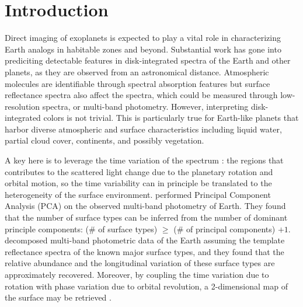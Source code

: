\documentclass[iop,numberedappendix,apj]{emulateapj}
\begin{document}
  



\section{Introduction}
\label{sec:intro}

Direct imaging of exoplanets is expected to play a vital role in characterizing Earth analogs in habitable zones and beyond. 
Substantial work has gone into prediciting detectable features in disk-integrated spectra of the Earth and other planets, as they are observed from an astronomical distance. 
Atmospheric molecules are identifiable through spectral absorption features \citep[e.g.,][]{DesMarais2002} but surface reflectance spectra also affect the spectra, which could be measured through low-resolution spectra, or multi-band photometry. 
However, interpreting disk-integrated colors is not trivial. 
This is particularly true for Earth-like planets that harbor diverse atmospheric and surface characteristics including liquid water, partial cloud cover, continents, and possibly vegetation. 

A key here is to leverage the time variation of the spectrum \citep{Ford2001}: the regions that contributes to the scattered light change due to the planetary rotation and  orbital motion, so the time variability can in principle be translated to the heterogeneity of the surface environment.  
\citet{Cowan2009, Cowan2011} performed Principal Component Analysis (PCA) on the observed multi-band photometry of Earth. They found that the number of surface types can be inferred from the number of dominant principle components: (\# of surface types) $\ge $ (\# of principal components) $+ 1$. %
\citet{Fujii2010, Fujii2011} decomposed multi-band photometric data of the Earth assuming the template reflectance spectra of the known major surface types, and they found that the relative abundance and the longitudinal variation of these surface types are approximately recovered. 
Moreover, by coupling the time variation due to rotation with phase variation due to orbital revolution, a 2-dimensional map of the surface may be retrieved \citep{Kawahara2010, Kawahara2011, Fujii2012}. 
\end{document}
